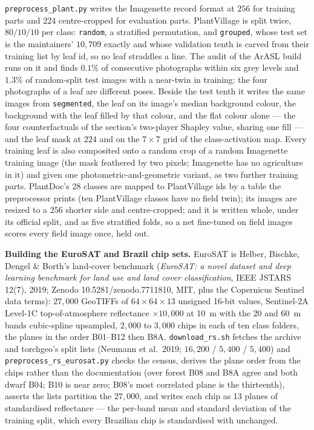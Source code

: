 \texttt{preprocess\_plant.py} writes the Imagenette record format at $256$
for training parts and $224$ centre-cropped for evaluation parts. PlantVillage
is split twice, $80/10/10$ per class: \texttt{random}, a stratified
permutation, and \texttt{grouped}, whose test set is the maintainers'
$10{,}709$ exactly and whose validation tenth is carved from their training
list by leaf id, so no leaf straddles a line. The audit of the ArASL build
runs on it and finds $0.1\%$ of consecutive photographs within six grey
levels and $1.3\%$ of random-split test images with a near-twin in training:
the four photographs of a leaf are different poses. Beside the test tenth it
writes the same images from \texttt{segmented}, the leaf on its image's median
background colour, the background with the leaf filled by that colour, and
the flat colour alone --- the four counterfactuals of the section's two-player
Shapley value, sharing one fill --- and the leaf mask at $224$ and on the
$7\times7$ grid of the class-activation map. Every training leaf is also
composited onto a random crop of a random Imagenette training image (the mask
feathered by two pixels; Imagenette has no agriculture in it) and given one
photometric-and-geometric variant, as two further training parts. PlantDoc's
28 classes are mapped to PlantVillage ids by a table the preprocessor prints
(ten PlantVillage classes have no field twin); its images are resized to a
$256$ shorter side and centre-cropped; and it is written whole, under its
official split, and as five stratified folds, so a net fine-tuned on field
images scores every field image once, held out.

\medskip\noindent\textbf{Building the EuroSAT and Brazil chip sets.}
EuroSAT is Helber, Bischke, Dengel \& Borth's land-cover benchmark
(\emph{EuroSAT: a novel dataset and deep learning benchmark for land use and
land cover classification}, IEEE JSTARS 12(7), 2019; Zenodo 10.5281/zenodo.7711810,
MIT, plus the Copernicus Sentinel data terms): $27{,}000$ GeoTIFFs of
$64\times64\times13$ unsigned 16-bit values, Sentinel-2A Level-1C
top-of-atmosphere reflectance $\times 10{,}000$ at 10~m with the 20 and
60~m bands cubic-spline upsampled, $2{,}000$ to $3{,}000$ chips in each of
ten class folders, the planes in the order B01--B12 then B8A.
\texttt{download\_rs.sh} fetches the archive and torchgeo's split lists
(Neumann et al.\ 2019; $16{,}200$ / $5{,}400$ / $5{,}400$) and
\texttt{preprocess\_rs\_eurosat.py} checks the census, derives the plane
order from the chips rather than the documentation (over forest B08 and B8A
agree and both dwarf B04; B10 is near zero; B08's most correlated plane is
the thirteenth), asserts the lists partition the $27{,}000$, and writes
each chip as 13 planes of standardised reflectance --- the per-band mean and
standard deviation of the training split, which every Brazilian chip is
standardised with unchanged.

